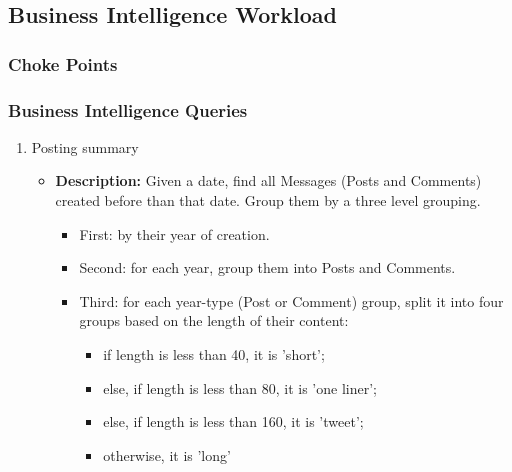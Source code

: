 
\subsection{Business Intelligence Workload}
\subsubsection{Choke Points}

\subsubsection{Business Intelligence Queries}

{\small
    \begin{enumerate}
      \item Posting summary 
            \begin{itemize}
                \item \textbf{Description:}
                  Given a date, find all Messages (Posts and Comments) created before than that date.
                  Group them by a three level grouping.

                  \begin{itemize}
                    \item First: by their year of creation.
                    \item Second: for each year, group them into Posts and Comments.
                    \item Third: for each year-type (Post or Comment) group, split it into four groups based on the
                              length of their content: 
                              \begin{itemize}
                                \item if length is less than 40, it is 'short'; 
                                \item else, if length is less than 80, it is 'one liner';
                                \item else, if length is less than 160, it is 'tweet';
                                \item otherwise, it is 'long'
                              \end{itemize}
                  \end{itemize}


\end{itemize}
\end{enumerate}}
